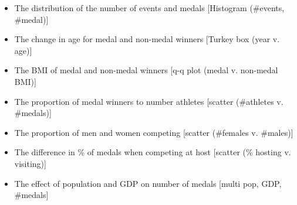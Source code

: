 \documentclass[a4 paper, 12pt]{article}
\begin{document}
        

        










    \begin{itemize}
        \item The distribution of the number of events and medals [Histogram (\#events, \#medal)]
        


        
        \item The change in age for medal and non-medal winners [Turkey box (year v. age)]
        \item The BMI of medal and non-medal winners [q-q plot (medal v. non-medal BMI)]
        \item The proportion of medal winners to number athletes [scatter (\#athletes v. \#medals)]
        \item The proportion of men and women competing [scatter (\#females v. \#males)]
        \item The difference in \% of medals when competing at host [scatter (\% hosting v. visiting)]
        \item The effect of population and GDP on number of medals [multi \- pop, GDP, \#medals]
    \end{itemize}




\pagebreak
\appendix
\addappheadtotoc
\appendixpage
\end{document}
